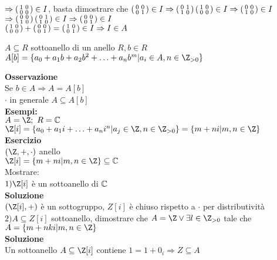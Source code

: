 \documentclass[12px]{article}
\begin{document}
	     $ \Rightarrow \left(\begin{smallmatrix}1&0\\0&0\end{smallmatrix}\right)\in I$, basta dimostrare che $\left(\begin{smallmatrix}0&0\\0&1\end{smallmatrix}\right)\in I \Rightarrow \left(\begin{smallmatrix}0&1\\1&0\end{smallmatrix}\right)\left(\begin{smallmatrix}1&0\\0&0\end{smallmatrix}\right)\in I \Rightarrow \left(\begin{smallmatrix}0&0\\1&0\end{smallmatrix}\right)\in I$ \\
	     $ \Rightarrow \left(\begin{smallmatrix}0&0\\1&0\end{smallmatrix}\right)\left(\begin{smallmatrix}0&1\\1&0\end{smallmatrix}\right)\in I \Rightarrow \left(\begin{smallmatrix}0&0\\0&1\end{smallmatrix}\right)\in I$ \\
	     $\left(\begin{smallmatrix}1&0\\0&0\end{smallmatrix}\right) + \left(\begin{smallmatrix}0&0\\0&1\end{smallmatrix}\right) = \left(\begin{smallmatrix}1&0\\0&1\end{smallmatrix}\right)\in I \Rightarrow I\in A$ 
	     \begin{defi}
	     	$A \subseteq R$ sottoanello di un anello $R, b\in R$\\
		$A[b] = \{a_0 + a_1b + a_2b^2 + \ldots + a_nb^m|a_i\in A, n\in \Z_{>0}\}$
	     \end{defi}
	     \textbf{Osservazione}\\
	     Se $b\in A \Rightarrow A = A[b]$ \\
	     $\cdot$ in generale $A\subseteq A[b]$\\
	     \textbf{Esempi:}\\
	     $A = \Z; \ R = \C$\\
	     $\Z[i] = \{a_0 + a_1i + \ldots + a_n i^n | a_j\in \Z, n\in \Z_{>0}\} = \{m + ni|m,n\in \Z\}$\\
	     \textbf{Esercizio}\\
	     $(\Z,+,\cdot)$ anello\\
	     $\Z[i] = \{m + ni|m,n\in \Z\}\subseteq \C$\\
	     Mostrare:\\
	     $1) \Z[i]$ è un sottoanello di $\mathbb{C}$\\
	      \textbf{Soluzione}\\
	      $(\Z[i], +)$ è un sottogruppo,  $Z[i]$ è chiuso rispetto a $\cdot$ per distributività\\
	      $2) A\subseteq Z[i]$ sottoanello, dimostrare che  $A = \Z \vee \exists l\in \Z_{>0}$ tale che $A = \{m + nki|m,n\in \Z\}$\\
	       \textbf{Soluzione}\\
	       Un sottoanello $A\subseteq \Z[i]$ contiene $1 = 1 + 0_i \Rightarrow  Z\subseteq A$ \\
\end{document}
